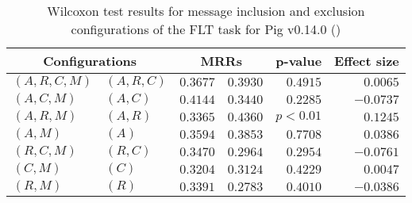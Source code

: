 
\begin{table}
\begin{spacing}{1.2}
\centering
\caption{Wilcoxon test results for message inclusion and exclusion configurations of the FLT task for Pig v0.14.0 (\ctwo)}
\label{table:versus-wilcox-pig-flt-message}
\begin{tabular}{ll|rr|rr}
\toprule
      \multicolumn{2}{c|}{Configurations} &                \multicolumn{2}{c|}{MRRs} &             p-value & Effect size \\
\midrule
 $(A,R,C,M)$ &  $(A,R,C)$ &       $0.3677$ &  $\bm{0.3930}$ & $0.4915$ &    $0.0065$ \\
   $(A,C,M)$ &    $(A,C)$ &  $\bm{0.4144}$ &       $0.3440$ & $0.2285$ &   $-0.0737$ \\
   $(A,R,M)$ &    $(A,R)$ &       $0.3365$ &  $\bm{0.4360}$ & $p<0.01$ &    $0.1245$ \\
     $(A,M)$ &      $(A)$ &       $0.3594$ &  $\bm{0.3853}$ & $0.7708$ &    $0.0386$ \\
   $(R,C,M)$ &    $(R,C)$ &  $\bm{0.3470}$ &       $0.2964$ & $0.2954$ &   $-0.0761$ \\
     $(C,M)$ &      $(C)$ &  $\bm{0.3204}$ &       $0.3124$ & $0.4229$ &    $0.0047$ \\
     $(R,M)$ &      $(R)$ &  $\bm{0.3391}$ &       $0.2783$ & $0.4010$ &   $-0.0386$ \\
\bottomrule
\end{tabular}

\end{spacing}
\end{table}

